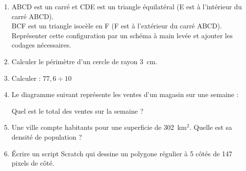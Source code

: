 \documentclass[a4paper,12pt]{article}
\newcommand{\np}[1]{\numprint{#1}}
\newcommand{\exercice}[2]{%
  \newpage
  \noindent{\Large\bfseries Exercice #1\hspace{0.3em}{\normalfont\normalsize(#2 points)}}%
  \par\vspace{0.7cm}%
}
\begin{document}
\begin{enumerate}[label=\textbf{\arabic*)}, leftmargin=1.2cm, itemsep=0.7cm]

\item ABCD est un carré et CDE est un triangle équilatéral (E est à l'intérieur du carré ABCD).\\
BCF est un triangle isocèle en F (F est à l'extérieur du carré ABCD).\\
Représenter cette configuration par un schéma à main levée et ajouter les codages nécessaires.

\item Calculer le périmètre d'un cercle de rayon 3~cm.

\item Calculer : $77{,}6 \div 10$

\item Le diagramme suivant représente les ventes d'un magasin sur une semaine :

\begin{center}
\end{center}

Quel est le total des ventes sur la semaine ?

\item Une ville compte \np{49298} habitants pour une superficie de 302~km$^2$. Quelle est sa densité de population ?

\item Écrire un script Scratch qui dessine un polygone régulier à 5 côtés de 147 pixels de côté.

\end{enumerate}

\exercice{2}{4}
\end{document}
